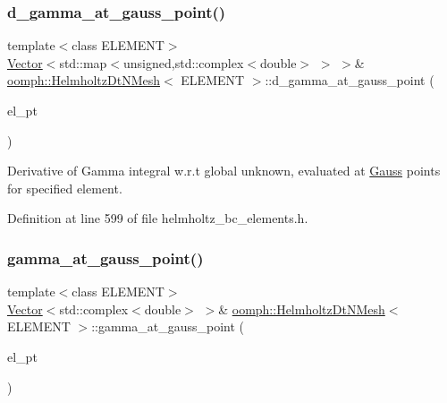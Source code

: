 \subsubsection{\texorpdfstring{d\+\_\+gamma\+\_\+at\+\_\+gauss\+\_\+point()}{d\_gamma\_at\_gauss\_point()}}
{\footnotesize\ttfamily template$<$class E\+L\+E\+M\+E\+NT$>$ \\
\hyperlink{classoomph_1_1Vector}{Vector}$<$std\+::map$<$unsigned,std\+::complex$<$double$>$ $>$ $>$\& \hyperlink{classoomph_1_1HelmholtzDtNMesh}{oomph\+::\+Helmholtz\+Dt\+N\+Mesh}$<$ E\+L\+E\+M\+E\+NT $>$\+::d\+\_\+gamma\+\_\+at\+\_\+gauss\+\_\+point (\begin{DoxyParamCaption}\item[{\hyperlink{classoomph_1_1FiniteElement}{Finite\+Element} $\ast$}]{el\+\_\+pt }\end{DoxyParamCaption})\hspace{0.3cm}{\ttfamily [inline]}}



Derivative of Gamma integral w.\+r.\+t global unknown, evaluated at \hyperlink{classoomph_1_1Gauss}{Gauss} points for specified element. 



Definition at line 599 of file helmholtz\+\_\+bc\+\_\+elements.\+h.

\mbox{\label{classoomph_1_1HelmholtzDtNMesh_a5750130241285c015fd4da6f1bc89a39}} 
\subsubsection{\texorpdfstring{gamma\+\_\+at\+\_\+gauss\+\_\+point()}{gamma\_at\_gauss\_point()}}
{\footnotesize\ttfamily template$<$class E\+L\+E\+M\+E\+NT$>$ \\
\hyperlink{classoomph_1_1Vector}{Vector}$<$std\+::complex$<$double$>$ $>$\& \hyperlink{classoomph_1_1HelmholtzDtNMesh}{oomph\+::\+Helmholtz\+Dt\+N\+Mesh}$<$ E\+L\+E\+M\+E\+NT $>$\+::gamma\+\_\+at\+\_\+gauss\+\_\+point (\begin{DoxyParamCaption}\item[{\hyperlink{classoomph_1_1FiniteElement}{Finite\+Element} $\ast$}]{el\+\_\+pt }\end{DoxyParamCaption})\hspace{0.3cm}{\ttfamily [inline]}}




